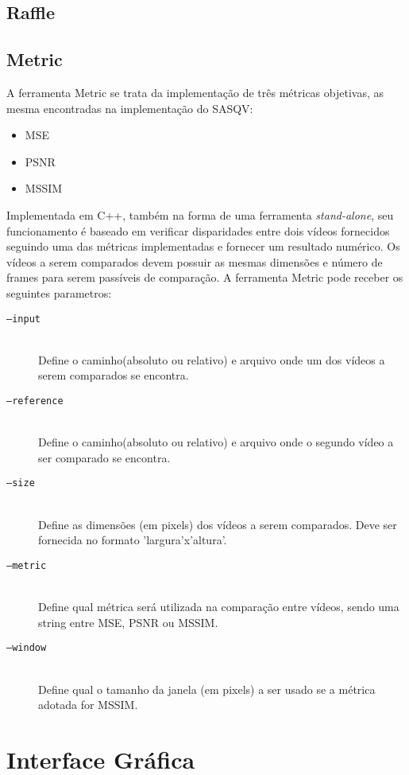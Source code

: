 \subsection{Raffle}
\subsection{Metric}

A ferramenta Metric se trata da implementação de três métricas objetivas, as mesma encontradas na implementação do SASQV:

\begin{itemize}
	\item MSE
	\item PSNR
	\item MSSIM
\end{itemize}

Implementada em C++, também na forma de uma ferramenta \emph{stand-alone}, seu funcionamento é baseado em verificar disparidades entre dois vídeos fornecidos seguindo uma das métricas implementadas e fornecer um resultado numérico. 
Os vídeos a serem comparados devem possuir as mesmas dimensões e número de frames para serem passíveis de comparação. 
A ferramenta Metric pode receber os seguintes parametros:

\begin{description}
	\item[\texttt{--input}] \hfill \\
		Define o caminho(absoluto ou relativo) e arquivo onde um dos vídeos a serem comparados se encontra.
	\item[\texttt{--reference}] \hfill \\
		Define o caminho(absoluto ou relativo) e arquivo onde o segundo vídeo a ser comparado se encontra.
	\item[\texttt{--size}] \hfill \\
		Define as dimensões (em pixels) dos vídeos a serem comparados. Deve ser fornecida no formato 'largura'x'altura'.
	\item[\texttt{--metric}] \hfill \\
		Define qual métrica será utilizada na comparação entre vídeos, sendo uma string entre MSE, PSNR ou MSSIM.
	\item[\texttt{--window}] \hfill \\
		Define qual o tamanho da janela (em pixels) a ser usado se a métrica adotada for MSSIM.
\end{description}

\section{Interface Gráfica}
